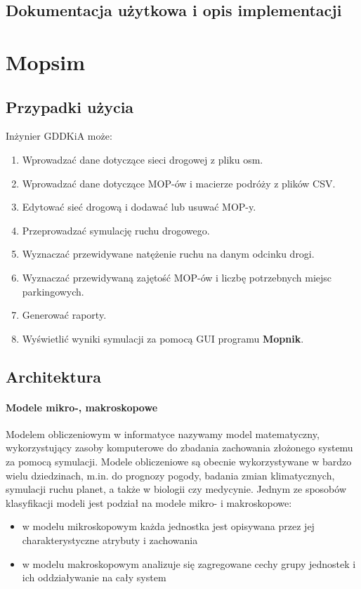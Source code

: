 \section{Dokumentacja użytkowa i opis implementacji}

\chapter{Mopsim}\label{r:Mopsim}

\section{Przypadki użycia}
Inżynier GDDKiA może:
\begin{enumerate}
  \item Wprowadzać dane dotyczące sieci drogowej z pliku osm.
  \item Wprowadzać dane dotyczące MOP-ów i macierze podróży z plików CSV.
  \item Edytować sieć drogową i dodawać lub usuwać MOP-y.
  \item Przeprowadzać symulację ruchu drogowego.
  \item Wyznaczać przewidywane natężenie ruchu na danym odcinku drogi.
  \item Wyznaczać przewidywaną zajętość MOP-ów i liczbę potrzebnych miejsc parkingowych.
  \item Generować raporty.
  \item Wyświetlić wyniki symulacji za pomocą GUI programu \textbf{Mopnik}.
\end{enumerate}

\section{Architektura}

\subsubsection{Modele mikro-, makroskopowe}
Modelem obliczeniowym w informatyce nazywamy model matematyczny, wykorzystujący zasoby komputerowe do zbadania zachowania złożonego systemu za pomocą symulacji\cite{model}. Modele obliczeniowe są obecnie wykorzystywane w bardzo wielu dziedzinach, m.in. do prognozy pogody, badania zmian klimatycznych, symulacji ruchu planet, a także w biologii czy medycynie. Jednym ze sposobów klasyfikacji modeli jest podział na modele mikro- i makroskopowe\cite{micmac}:
\begin{itemize}
\item w modelu mikroskopowym każda jednostka jest opisywana przez jej charakterystyczne atrybuty i zachowania
\item w modelu makroskopowym analizuje się zagregowane cechy grupy jednostek i ich oddziaływanie na cały system
\end{itemize}

